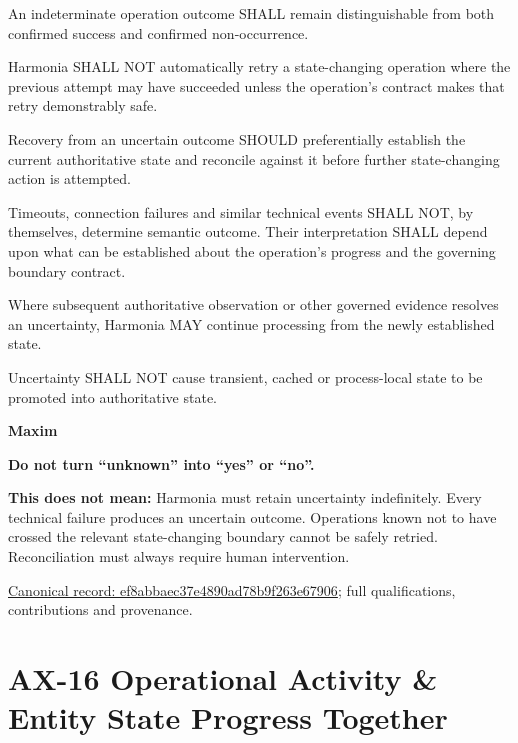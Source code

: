 An indeterminate operation outcome SHALL remain distinguishable from both confirmed success and confirmed non-occurrence.



Harmonia SHALL NOT automatically retry a state-changing operation where the previous attempt may have succeeded unless the operation's contract makes that retry demonstrably safe.



Recovery from an uncertain outcome SHOULD preferentially establish the current authoritative state and reconcile against it before further state-changing action is attempted.



Timeouts, connection failures and similar technical events SHALL NOT, by themselves, determine semantic outcome. Their interpretation SHALL depend upon what can be established about the operation's progress and the governing boundary contract.



Where subsequent authoritative observation or other governed evidence resolves an uncertainty, Harmonia MAY continue processing from the newly established state.



Uncertainty SHALL NOT cause transient, cached or process-local state to be promoted into authoritative state.



\par\medskip\textbf{Maxim}\par


\textbf{Do not turn “unknown” into “yes” or “no”.}



\textbf{This does not mean:} Harmonia must retain uncertainty indefinitely. Every technical failure produces an uncertain outcome. Operations known not to have crossed the relevant state-changing boundary cannot be safely retried. Reconciliation must always require human intervention.


{\footnotesize \href{../../../../continuum/motivation/principle/ef8abbaec37e4890ad78b9f263e67906.md}{Canonical record: ef8abbaec37e4890ad78b9f263e67906}; full qualifications, contributions and provenance.}\par
\section{AX-16 Operational Activity \& Entity State Progress Together}

